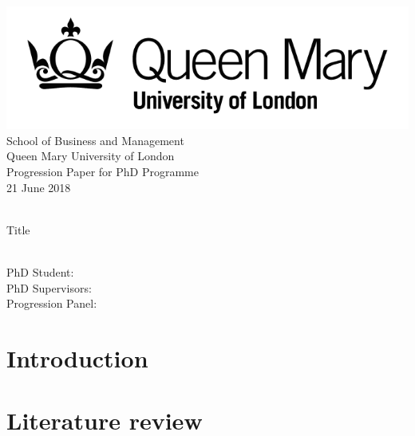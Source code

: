 \documentclass[11pt]{article}
\begin{document}
\begin{titlepage}            
    \begin{flushleft}{
        \includegraphics[width=0.3\linewidth]{figures/qmul_logo.png}\\
        School of Business and Management\\
        Queen Mary University of London\\[1cm]
        Progression Paper for PhD Programme\\
        21 June 2018\\[2cm]
    }\end{flushleft}
    \centering
    \HRule \\[1cm]
    {\huge Title}\\[1cm]
    \HRule \\[1cm]

    \begin{flushleft}{
        PhD Student: \\
        PhD Supervisors: \\
        Progression Panel: \\[1cm]
    }\end{flushleft}
\end{titlepage}


\section{Introduction\label{sec:introduction}}

\section{Literature review\label{sec:literature_review}}
\end{document}
